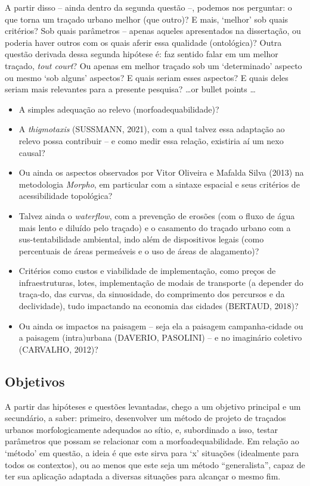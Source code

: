 \documentclass[twoside, 12pt, english,italian,latin,greek,french,spanish,brazil]{book}
\begin{document}
        A partir disso – ainda dentro da segunda questão –, podemos nos perguntar: o que torna um traçado urbano melhor (que outro)? E mais, ‘melhor’ sob quais critérios? Sob quais parâmetros – apenas aqueles apresentados na dissertação, ou poderia haver outros com os quais aferir essa qualidade (ontológica)? Outra questão derivada dessa segunda hipótese é: faz sentido falar em um melhor traçado, \textit{tout court}? Ou apenas em melhor traçado sob um ‘determinado’ aspecto ou mesmo ‘sob alguns’ aspectos? E quais seriam esses aspectos? E quais deles seriam mais relevantes para a presente pesquisa? 
        \dots or bullet points \dots
            \begin{itemize}
                \item A simples adequação ao relevo (morfoadequabilidade)? 
                \item A \textit{thigmotaxis} (SUSSMANN, 2021), com a qual talvez essa adaptação ao relevo possa contribuir – e como medir essa relação, existiria aí um nexo causal? 
                \item Ou ainda os aspectos observados por Vitor Oliveira e Mafalda Silva (2013) na metodologia \textit{Morpho}, em particular com a sintaxe espacial e seus critérios de acessibilidade topológica? 
                \item Talvez ainda o \textit{waterflow}, com a prevenção de erosões (com o fluxo de água mais lento e diluído pelo traçado) e o casamento do traçado urbano com a sus-tentabilidade ambiental, indo além de dispositivos legais (como percentuais de áreas permeáveis e o uso de áreas de alagamento)? 
                \item Critérios como custos e viabilidade de implementação, como preços de infraestruturas, lotes, implementação de modais de transporte (a depender do traça-do, das curvas, da sinuosidade, do comprimento dos percursos e da declividade), tudo impactando na economia das cidades (BERTAUD, 2018)?
                \item Ou ainda os impactos na paisagem – seja ela a paisagem campanha-cidade ou a paisagem (intra)urbana (DAVERIO, PASOLINI) – e no imaginário coletivo (CARVALHO, 2012)?
            \end{itemize}

    \subsection{Objetivos}	 

        A partir das hipóteses e questões levantadas, chego a um objetivo principal e um secundário, a saber: primeiro, desenvolver um método de projeto de traçados urbanos morfologicamente adequados ao sítio, e, subordinado a isso, testar parâmetros que possam se relacionar com a morfoadequabilidade. Em relação ao ‘método’ em questão, a ideia é que este sirva para ‘x’ situações (idealmente para todos os contextos), ou ao menos que este seja um método “generalista”, capaz de ter sua aplicação adaptada a diversas situações para alcançar o mesmo fim.
\end{document}
